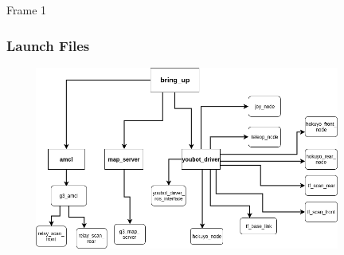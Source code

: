 
\begin{frame}{Frame 1}
\frametitle {Launch Files}
\centering
 \includegraphics[width=120mm,height=60mm]{launchfile.png}

 
\end{frame}
